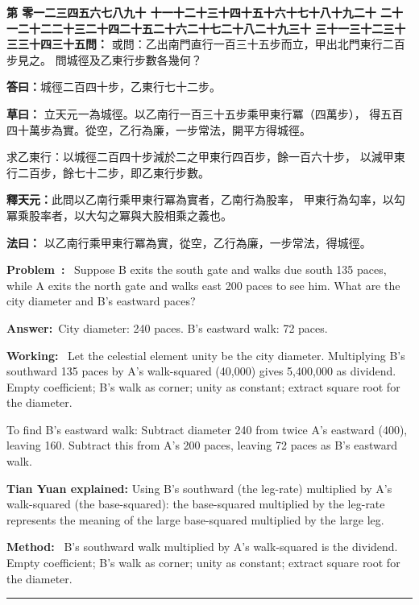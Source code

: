 \documentclass[9pt,a4paper]{article}
\newcounter{probnum}
\newcounter{overallnum}
\newcommand{\chnum}[1]{%
  \ifcase#1 零\or 一\or 二\or 三\or 四\or 五\or 六\or 七\or 八\or 九\or 十\or
    十一\or 十二\or 十三\or 十四\or 十五\or 十六\or 十七\or 十八\or 十九\or 二十\or
    二十一\or 二十二\or 二十三\or 二十四\or 二十五\or 二十六\or 二十七\or 二十八\or 二十九\or 三十\or
    三十一\or 三十二\or 三十三\or 三十四\or 三十五\fi}
\newcommand{\problem}[1]{\stepcounter{probnum}\stepcounter{overallnum}\par\noindent\textbf{\color{volcolor}第\chnum{\value{probnum}}問：}#1\par\vspace{0.15cm}}
\newcommand{\answer}[1]{\par\noindent\textbf{答曰：}#1\par\vspace{0.15cm}}
\newcommand{\working}[1]{\par\noindent\textbf{草曰：}#1\par\vspace{0.15cm}}
\newcommand{\method}[1]{\par\noindent\textbf{法曰：}#1\par\vspace{0.25cm}}
\newcommand{\eproblem}[1]{\par\noindent\textbf{\color{volcolor}Problem~\theoverallnum:}~#1\par\vspace{0.15cm}}
\newcommand{\eanswer}[1]{\par\noindent\textbf{Answer:}~#1\par\vspace{0.15cm}}
\newcommand{\eworking}[1]{\par\noindent\textbf{Working:}~#1\par\vspace{0.15cm}}
\newcommand{\emethod}[1]{\par\noindent\textbf{Method:}~#1\par\vspace{0.25cm}}
\begin{document}
\noindent\begin{minipage}[t]{0.48\textwidth}
\problem{
或問：乙出南門直行一百三十五步而立，甲出北門東行二百步見之。
問城徑及乙東行步數各幾何？
}

\answer{城徑二百四十步，乙東行七十二步。}

\working{
立天元一為城徑。以乙南行一百三十五步乘甲東行冪（四萬步），
得五百四十萬步為實。從空，乙行為廉，一步常法，開平方得城徑。

求乙東行：以城徑二百四十步減於二之甲東行四百步，餘一百六十步，
以減甲東行二百步，餘七十二步，即乙東行步數。

\textbf{釋天元：}此問以乙南行乘甲東行冪為實者，乙南行為股率，
甲東行為勾率，以勾冪乘股率者，以大勾之冪與大股相乘之義也。
}

\method{
以乙南行乘甲東行冪為實，從空，乙行為廉，一步常法，得城徑。
}
\end{minipage}%
\hfill%
\begin{minipage}[t]{0.50\textwidth}
\eproblem{
Suppose B exits the south gate and walks due south 135 paces, while A exits
the north gate and walks east 200 paces to see him. What are the city diameter
and B's eastward paces?
}

\eanswer{City diameter: 240 paces. B's eastward walk: 72 paces.}

\eworking{
Let the celestial element unity be the city diameter. Multiplying B's
southward 135 paces by A's walk-squared (40,000) gives 5,400,000 as dividend.
Empty coefficient; B's walk as corner; unity as constant; extract square
root for the diameter.

To find B's eastward walk: Subtract diameter 240 from twice A's eastward
(400), leaving 160. Subtract this from A's 200 paces, leaving 72 paces as
B's eastward walk.

\textbf{Tian Yuan explained:} Using B's southward (the leg-rate) multiplied
by A's walk-squared (the base-squared): the base-squared multiplied by the
leg-rate represents the meaning of the large base-squared multiplied by
the large leg.
}

\emethod{
B's southward walk multiplied by A's walk-squared is the dividend. Empty
coefficient; B's walk as corner; unity as constant; extract square root
for the diameter.
}
\end{minipage}
\vspace{0.15cm}

\vspace{0.15cm}
\noindent\rule{\textwidth}{0.2pt}
\vspace{0.15cm}
\end{document}
